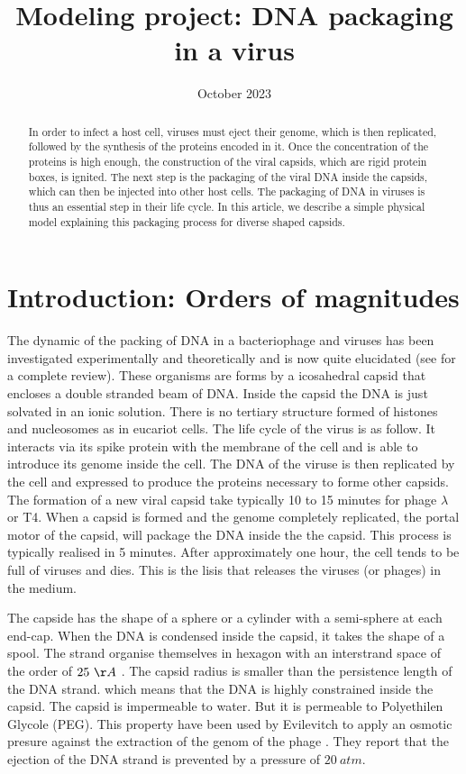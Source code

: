 \documentclass{article}
\title{Modeling project: DNA packaging in a virus}
\author{}
\date{October 2023}
\begin{document}
\maketitle

\begin{abstract}
\noindent
In order to infect a host cell, viruses must eject their genome, which is then replicated, followed by the synthesis of the proteins encoded in it. Once the concentration of the proteins is high enough, the construction of the viral capsids, which are rigid protein boxes, is ignited. The next step is the packaging of the viral DNA inside the capsids, which can then be injected into other host cells. The packaging of DNA in viruses is thus an essential step in their life cycle. In this article, we describe a simple physical model explaining this packaging process for diverse shaped capsids. 
\end{abstract}


\section{Introduction: Orders of magnitudes}
The dynamic of the packing of DNA in a bacteriophage and viruses has been investigated experimentally and theoretically and is now quite elucidated (see \cite{phillips2005} for a complete review). These organisms are forms by a icosahedral capsid that encloses a double stranded beam of DNA. Inside the capsid the DNA is just solvated in an ionic solution. There is no tertiary structure formed of histones and nucleosomes as in eucariot cells. The life cycle of the virus is as follow. It interacts via its spike protein with the membrane of the cell and is able to introduce its genome inside the cell. The DNA of the viruse is then replicated by the cell and expressed to produce the proteins necessary to forme other capsids. The formation of a new viral capsid take typically 10 to 15 minutes for phage $\lambda$ or T4. When a capsid is formed and the genome completely replicated, the portal motor of the capsid, will package the DNA inside the the capsid. This process is typically realised in 5 minutes. After approximately one hour, the cell tends to be full of viruses and dies. This is the lisis that releases the viruses (or phages) in the medium.

The capside has the shape of a sphere or a cylinder with a semi-sphere at each end-cap. When the DNA is condensed inside the capsid, it takes the shape of a spool. The strand organise themselves in hexagon with an interstrand space of the order of $25~\AA$ \cite{earnshaw1977}. The capsid radius is smaller than the persistence length of the DNA strand. which means that the DNA is highly constrained inside the capsid. The capsid is impermeable to water. But it is permeable to Polyethilen Glycole (PEG). This property have been used by Evilevitch to apply an osmotic presure against the extraction of the genom of the phage \cite{evilevitch2003}. They report that the ejection of the DNA strand is prevented by a pressure of $20~atm.$
\end{document}
